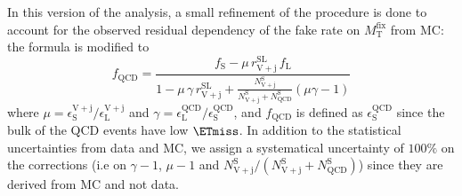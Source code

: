 In this version of the analysis, a small refinement of the procedure is done to account for the observed residual dependency of the fake rate on $M_\mathrm{T}^{\mathrm{fix}}$ from MC: the formula is modified to 
    \[ f_\mathrm{QCD}  = \frac{f_\mathrm{S} - \mu\,r^\mathrm{SL}_\mathrm{V+j}\,f_\mathrm{L}}{1 - \mu\,\gamma\,r^\mathrm{SL}_\mathrm{V+j} + \frac{N^\mathrm{S}_\mathrm{V+j}}{N^\mathrm{S}_\mathrm{V+j}+N^\mathrm{S}_\mathrm{QCD}} (\mu \gamma - 1)} \]
where $\mu = \epsilon^\mathrm{V+j}_\mathrm{S}/\epsilon^\mathrm{V+j}_\mathrm{L}$ and $\gamma = \epsilon^\mathrm{QCD}_\mathrm{L}/\epsilon^\mathrm{QCD}_\mathrm{S}$, and $f_\mathrm{QCD}$ is defined as $\epsilon^\mathrm{QCD}_\mathrm{S}$ since the bulk of the QCD events have low $\ETmiss$. In addition to the statistical uncertainties from data and MC, we assign a systematical uncertainty of $100\%$ on the corrections (i.e on $\gamma-1$, $\mu-1$ and ${N^\mathrm{S}_\mathrm{V+j}}/({N^\mathrm{S}_\mathrm{V+j}+N^\mathrm{S}_\mathrm{QCD}})$) since they are derived from MC and not data.

